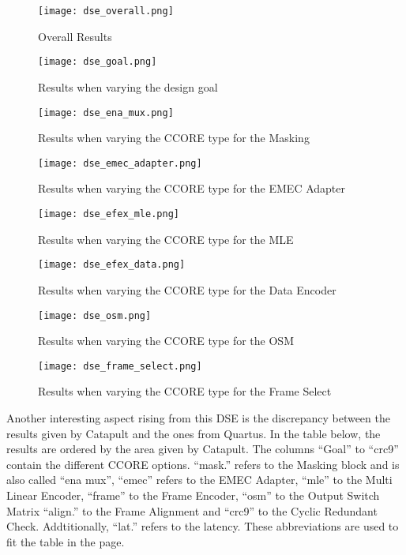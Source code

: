 \begin{figure}
    \centering
    \texttt{[image: dse\_overall.png]}
    \caption{Overall Results}
    \label{fig:dse-overall}
    \centering
    \texttt{[image: dse\_goal.png]}
    \caption{Results when varying the design goal}
    \label{fig:dse-goal}
\end{figure}
\begin{figure}
    \centering
    \texttt{[image: dse\_ena\_mux.png]}
    \caption{Results when varying the CCORE type for the Masking}
    \label{fig:dse-ena-mux}
    \centering
    \texttt{[image: dse\_emec\_adapter.png]}
    \caption{Results when varying the CCORE type for the EMEC Adapter}
    \label{fig:dse-emec-adapter}
\end{figure}
\begin{figure}
    \centering
    \texttt{[image: dse\_efex\_mle.png]}
    \caption{Results when varying the CCORE type for the MLE}
    \label{fig:dse-efex-mle}    
    \centering
    \texttt{[image: dse\_efex\_data.png]}
    \caption{Results when varying the CCORE type for the Data Encoder}
    \label{fig:dse-efex-data}
\end{figure}
\begin{figure}
    \centering
    \texttt{[image: dse\_osm.png]}
    \caption{Results when varying the CCORE type for the OSM}
    \label{fig:dse-osm}
    \centering
    \texttt{[image: dse\_frame\_select.png]}
    \caption{Results when varying the CCORE type for the Frame Select}
    \label{fig:dse-frame-select}
\end{figure}

Another interesting aspect rising from this DSE is the discrepancy between the results given by Catapult and the ones from Quartus. In the table below, the results are ordered by the area given by Catapult. The columns ``Goal'' to ``crc9'' contain the different CCORE options. ``mask.'' refers to the Masking block and is also called ``ena mux'',  ``emec'' refers to the EMEC Adapter, ``mle'' to the Multi Linear Encoder, ``frame'' to the Frame Encoder, ``osm'' to the Output Switch Matrix ``align.'' to the Frame Alignment and ``crc9'' to the Cyclic Redundant Check. Addtitionally, ``lat.'' refers to the latency. These abbreviations are used to fit the table in the page.

